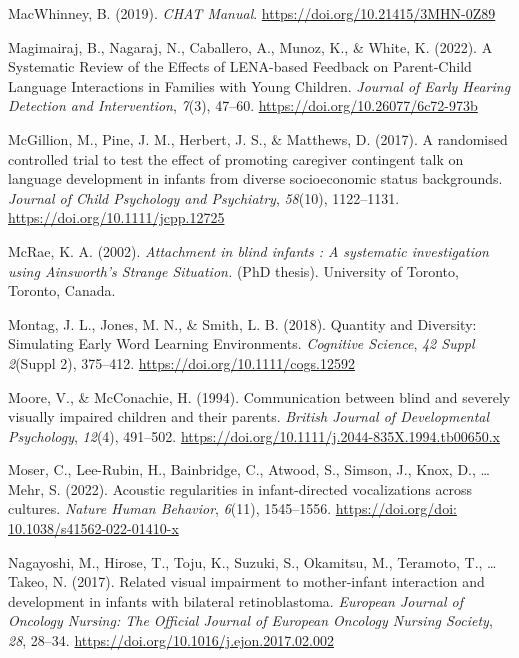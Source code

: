 \documentclass[
  man,floatsintext]{apa6}
\newlength{\cslhangindent}
\newlength{\cslentryspacingunit} %
\newenvironment{CSLReferences}[2] %
 {%
  \setlength{\parindent}{0pt}
  \ifodd #1
  \let\oldpar\par
  \def\par{\hangindent=\cslhangindent\oldpar}
  \fi
  \setlength{\parskip}{#2\cslentryspacingunit}
 }%
 {}
\begin{document}
\begin{CSLReferences}{1}{0}
\leavevmode{}%
MacWhinney, B. (2019). \emph{{CHAT Manual}}. \url{https://doi.org/10.21415/3MHN-0Z89}

\leavevmode{}%
Magimairaj, B., Nagaraj, N., Caballero, A., Munoz, K., \& White, K. (2022). A {Systematic Review} of the {Effects} of {LENA-based Feedback} on {Parent-Child Language Interactions} in {Families} with {Young Children}. \emph{Journal of Early Hearing Detection and Intervention}, \emph{7}(3), 47--60. \url{https://doi.org/10.26077/6c72-973b}

\leavevmode{}%
McGillion, M., Pine, J. M., Herbert, J. S., \& Matthews, D. (2017). A randomised controlled trial to test the effect of promoting caregiver contingent talk on language development in infants from diverse socioeconomic status backgrounds. \emph{Journal of Child Psychology and Psychiatry}, \emph{58}(10), 1122--1131. \url{https://doi.org/10.1111/jcpp.12725}

\leavevmode{}%
McRae, K. A. (2002). \emph{Attachment in blind infants : A systematic investigation using {Ainsworth}'s {Strange Situation}.} (PhD thesis). University of Toronto, Toronto, Canada.

\leavevmode{}%
Montag, J. L., Jones, M. N., \& Smith, L. B. (2018). Quantity and {Diversity}: {Simulating Early Word Learning Environments}. \emph{Cognitive Science}, \emph{42 Suppl 2}(Suppl 2), 375--412. \url{https://doi.org/10.1111/cogs.12592}

\leavevmode{}%
Moore, V., \& McConachie, H. (1994). Communication between blind and severely visually impaired children and their parents. \emph{British Journal of Developmental Psychology}, \emph{12}(4), 491--502. \url{https://doi.org/10.1111/j.2044-835X.1994.tb00650.x}

\leavevmode{}%
Moser, C., Lee-Rubin, H., Bainbridge, C., Atwood, S., Simson, J., Knox, D., \ldots{} Mehr, S. (2022). Acoustic regularities in infant-directed vocalizations across cultures. \emph{Nature Human Behavior}, \emph{6}(11), 1545--1556. \href{https://doi.org/doi:\%2010.1038/s41562-022-01410-x}{https://doi.org/doi: 10.1038/s41562-022-01410-x}

\leavevmode{}%
Nagayoshi, M., Hirose, T., Toju, K., Suzuki, S., Okamitsu, M., Teramoto, T., \ldots{} Takeo, N. (2017). Related visual impairment to mother-infant interaction and development in infants with bilateral retinoblastoma. \emph{European Journal of Oncology Nursing: The Official Journal of European Oncology Nursing Society}, \emph{28}, 28--34. \url{https://doi.org/10.1016/j.ejon.2017.02.002}


\end{CSLReferences}
\end{document}
